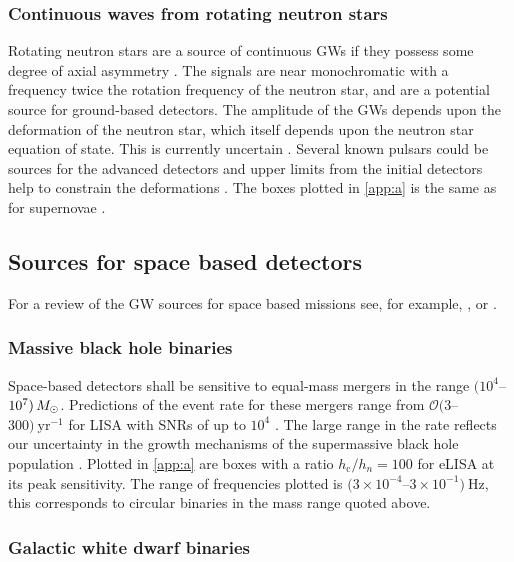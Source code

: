 \subsubsection{Continuous waves from rotating neutron stars}

Rotating neutron stars are a source of continuous GWs if they possess some degree of axial asymmetry \citep{Abbott2007, Prix2009, Einstein@Home}. The signals are near monochromatic with a frequency twice the rotation frequency of the neutron star, and are a potential source for ground-based detectors. The amplitude of the GWs depends upon the deformation of the neutron star, which itself depends upon the neutron star equation of state. This is currently uncertain \citep{Lattimer2012}. Several known pulsars could be sources for the advanced detectors and upper limits from the initial detectors help to constrain the deformations \citep{Aasi2014a}. The boxes plotted in \ref{app:a} is the same as for supernovae .

\subsection{Sources for space based detectors}

For a review of the GW sources for space based missions see, for example, \citet{Amaro-Seoane-et-al}, \citet{Gairetal} or \citet{eLISAyellowbook}.


\subsubsection{Massive black hole binaries}

Space-based detectors shall be sensitive to equal-mass mergers in the range $(10^{4}$--$10^{7})\,M_{ \odot }$. Predictions of the event rate for these mergers range from ${\mathcal{O}}(3$--$300)~\mathrm{yr}^{-1}$ for LISA with SNRs of up to $10^4$ . The large range in the rate reflects our uncertainty in the growth mechanisms of the supermassive black hole population \citep{Volonteri2010}. Plotted in \ref{app:a} are boxes with a ratio $h_\mathrm{c}/h_{n}=100$ for eLISA at its peak sensitivity. The range of frequencies plotted is $(3\times 10^{-4}$--$3\times 10^{-1})~\mathrm{Hz}$, this corresponds to circular binaries in the mass range quoted above.

\subsubsection{Galactic white dwarf binaries} \label{sec:GB}

